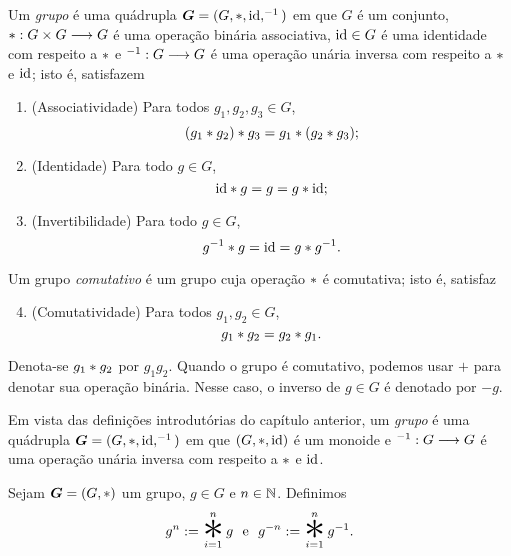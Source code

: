 \begin{defi}
Um \emph{grupo} é uma quádrupla $\bm G=(G,\ast,\mathrm{id},^{-1})$ em que $G$ é um conjunto, $\ast : G \times G \longrightarrow G$ é uma operação binária associativa, $\mathrm{id} \in G$ é uma identidade com respeito a $\ast$ e $^{-1}: G \longrightarrow G$ é uma operação unária inversa com respeito a $\ast$ e $\mathrm{id}$; isto é, satisfazem
	\begin{enumerate}[label=\textbf{G\arabic*.},ref={G\arabic*}]
	\item \label{G1}(Associatividade) Para todos $g_1,g_2,g_3 \in G$,
		\begin{equation*}
		(g_1 \ast g_2) \ast g_3 = g_1 \ast (g_2 \ast g_3);
		\end{equation*}
	\item \label{G2} (Identidade) Para todo $g \in G$,
		\begin{equation*}
		\mathrm{id} \ast  g = g =g  \ast \mathrm{id};
		\end{equation*}
	\item \label{G3} (Invertibilidade) Para todo $g \in G$,
		\begin{equation*}
		g^{-1} \ast g = \mathrm{id} = g \ast g^{-1}.
		\end{equation*}
	\end{enumerate}
\noindent
Um grupo \emph{comutativo} é um grupo cuja operação $\ast$ é comutativa; isto é, satisfaz
	\begin{enumerate}[label=\textbf{G\arabic*.},ref={G\arabic*}]
	\setcounter{enumi}{3}
	\item \label{G4} (Comutatividade) Para todos $g_1,g_2 \in G$,
	\begin{equation*}
	g_1 \ast g_2 = g_2 \ast g_1.
	\end{equation*}
	\end{enumerate}
Denota-se $g_1 \ast g_2$ por $g_1g_2$. Quando o grupo é comutativo, podemos usar $+$ para denotar sua operação binária. Nesse caso, o inverso de $g \in G$ é denotado por $-g$.
\end{defi}

Em vista das definições introdutórias do capítulo anterior, um \emph{grupo} é uma quádrupla $\bm G=(G,\ast,\mathrm{id},^{-1})$ em que $(G,\ast,\mathrm{id})$ é um monoide e $^{-1}: G \longrightarrow G$ é uma operação unária inversa com respeito a $\ast$ e $\mathrm{id}$.

\begin{defi}
Sejam $\bm G=(G,\ast)$ um grupo, $g \in G$ e $n \in \mathbb{N}$. Definimos
	\begin{equation*}
	g^n := \bigopb_{i=1}^n g \e g^{-n} := \bigopb_{i=1}^n g^{-1}.
	\end{equation*}
\end{defi}

